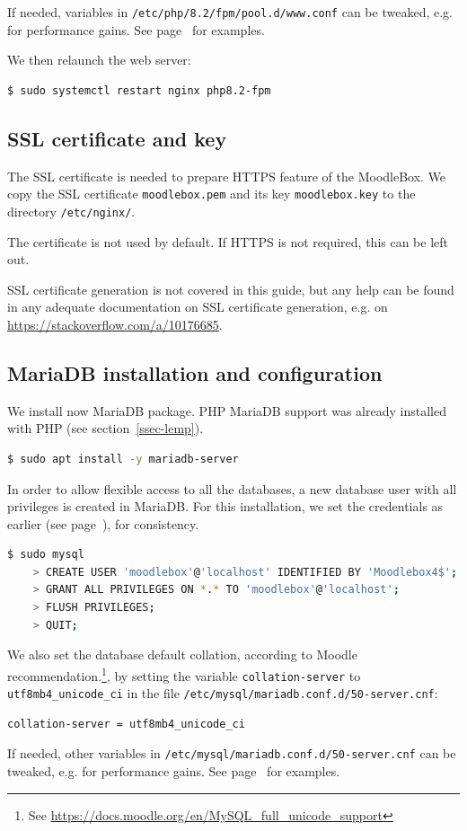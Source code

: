 \documentclass[12pt]{article}
\begin{document}
If needed, variables in \lstinline{/etc/php/8.2/fpm/pool.d/www.conf} can be tweaked, e.g. for performance gains. See page~\pageref{ssec-php-optimisation} for examples.

We then relaunch the web server:
\begin{lstlisting}[language=bash]
$ sudo systemctl restart nginx php8.2-fpm
\end{lstlisting}

\subsection{SSL certificate and key}

The SSL certificate is needed to prepare HTTPS feature of the MoodleBox.
We copy the SSL certificate \lstinline{moodlebox.pem} and its key \lstinline{moodlebox.key} to the directory \lstinline{/etc/nginx/}.

The certificate is not used by default.
If HTTPS is not required, this can be left out.

SSL certificate generation is not covered in this guide, but any help can be
found in any adequate documentation on SSL certificate generation, e.g. on \url{https://stackoverflow.com/a/10176685}.

\subsection{MariaDB installation and configuration}\label{ssec-mariadb}

We install now MariaDB package.
PHP MariaDB support was already installed with PHP (see section~\ref{ssec-lemp}).
\begin{lstlisting}[language=bash]
$ sudo apt install -y mariadb-server
\end{lstlisting}

In order to allow flexible access to all the databases, a new database user with all privileges is created in MariaDB.
For this installation, we set the credentials as earlier (see page~\pageref{ssec-new-account}), for consistency.

\begin{lstlisting}[language=bash]
$ sudo mysql
    > CREATE USER 'moodlebox'@'localhost' IDENTIFIED BY 'Moodlebox4$';
    > GRANT ALL PRIVILEGES ON *.* TO 'moodlebox'@'localhost';
    > FLUSH PRIVILEGES;
    > QUIT;
\end{lstlisting}
We also set the database default collation, according to Moodle recommendation.\footnote{See \url{https://docs.moodle.org/en/MySQL_full_unicode_support}}, by setting the variable \lstinline{collation-server} to \lstinline{utf8mb4_unicode_ci} in the file \lstinline{/etc/mysql/mariadb.conf.d/50-server.cnf}:
\begin{lstlisting}[language=bash]
collation-server = utf8mb4_unicode_ci
\end{lstlisting}
If needed, other variables in \lstinline{/etc/mysql/mariadb.conf.d/50-server.cnf} can be tweaked, e.g. for performance gains. See page~\pageref{ssec-mariadb-optimisation} for examples.
\end{document}
